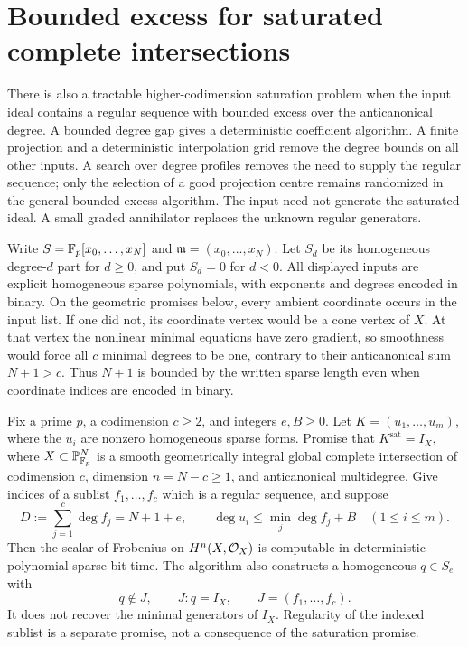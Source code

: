 \section{Bounded excess for saturated complete intersections}
\label{sci:sec}

There is also a tractable higher-codimension saturation problem when the
input ideal contains a regular sequence with bounded excess over the
anticanonical degree. A bounded degree gap gives a deterministic
coefficient algorithm. A finite projection and a deterministic interpolation
grid remove the degree bounds on all other inputs. A search over degree
profiles removes the need to supply the regular sequence; only the
selection of a good projection centre remains randomized in the general
bounded-excess algorithm. The input need not generate the saturated
ideal. A small graded annihilator replaces the unknown regular generators.

Write \(S=\mathbb F_p[x_0,\ldots,x_N]\) and \(\mathfrak m=(x_0,\ldots,x_N)\).
Let \(S_d\) be its homogeneous degree-\(d\) part for \(d\geq0\), and
put \(S_d=0\) for \(d<0\). All displayed inputs are explicit homogeneous
sparse polynomials, with exponents and degrees encoded in binary.
On the geometric promises below, every ambient coordinate occurs in
the input list. If one did not, its coordinate vertex would be a cone
vertex of \(X\). At that vertex the nonlinear minimal equations have
zero gradient, so smoothness would force all \(c\) minimal degrees to
be one, contrary to their anticanonical sum \(N+1>c\). Thus \(N+1\)
is bounded by the written sparse length even when coordinate indices
are encoded in binary.

\begin{theorem}
\label{sci:thm:gap}
Fix a prime \(p\), a codimension \(c\geq2\), and integers \(e,B\geq0\).
Let \(K=(u_1,\ldots,u_m)\), where the \(u_i\) are nonzero homogeneous
sparse forms. Promise that \(K^{\mathrm{sat}}=I_X\), where
\(X\subset\mathbb P^N_{\mathbb F_p}\) is a smooth geometrically integral global
complete intersection of codimension \(c\), dimension \(n=N-c\geq1\),
and anticanonical multidegree. Give indices of a sublist
\(f_1,\ldots,f_c\) which is a regular sequence, and suppose
\[
 D:=\sum_{j=1}^c\deg f_j=N+1+e,\qquad
 \deg u_i\leq \min_j\deg f_j+B\quad(1\leq i\leq m).
\]
Then the scalar of Frobenius on \(H^n(X,\mathcal O_X)\) is computable in
deterministic polynomial sparse-bit time. The algorithm also constructs
a homogeneous \(q\in S_e\) with
\[
 q\notin J,\qquad J:q=I_X,\qquad J=(f_1,\ldots,f_c).
\]
It does not recover the minimal generators of \(I_X\).
Regularity of the indexed sublist is a separate promise, not a
consequence of the saturation promise.
\end{theorem}

